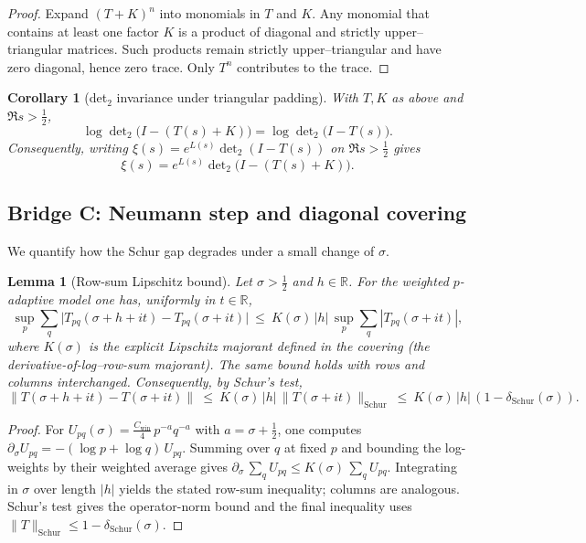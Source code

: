 \documentclass[11pt]{article}
\newtheorem{lemma}[theorem]{Lemma}
\newtheorem{corollary}[theorem]{Corollary}
\theoremstyle{definition}
\theoremstyle{remark}
\newcommand{\R}{\mathbb{R}}
\begin{document}
\begin{proof}
Expand $(T+K)^n$ into monomials in $T$ and $K$. Any monomial that contains at least one factor $K$ is a product of diagonal and strictly upper--triangular matrices. Such products remain strictly upper--triangular and have zero diagonal, hence zero trace. Only $T^n$ contributes to the trace.
\end{proof}

\begin{corollary}[det$_2$ invariance under triangular padding]\label{cor:det2-invariance}
With $T, K$ as above and $\Re s>\tfrac12$,
\[
\log\det\nolimits_2\!\big(I-(T(s)+K)\big) = \log\det\nolimits_2\!\big(I-T(s)\big).
\]
Consequently, writing $\xi(s)=e^{L(s)}\det_2(I-T(s))$ on $\Re s>\tfrac12$ gives
\[
\xi(s)=e^{L(s)}\det\nolimits_2\!\big(I-(T(s)+K)\big).
\]
\end{corollary}

\subsection*{Bridge C: Neumann step and diagonal covering}

We quantify how the Schur gap degrades under a small change of $\sigma$.

\begin{lemma}[Row-sum Lipschitz bound]\label{lem:rowsum-lip}
Let $\sigma>\tfrac12$ and $h\in\R$. For the weighted $p$-adaptive model one has, uniformly in $t\in\R$,
\[
  \sup_p \sum_q \big| T_{pq}(\sigma+h+it)-T_{pq}(\sigma+it)\big|\ \le\ K(\sigma)\,|h|\,\sup_p \sum_q |T_{pq}(\sigma+it)|,
\]
where $K(\sigma)$ is the explicit Lipschitz majorant defined in the covering (the derivative-of-log--row-sum majorant). The same bound holds with rows and columns interchanged. Consequently, by Schur's test,
\[
  \|T(\sigma+h+it)-T(\sigma+it)\|\ \le\ K(\sigma)\,|h|\,\|T(\sigma+it)\|_{\mathrm{Schur}}\ \le\ K(\sigma)\,|h|\,(1-\delta_{\mathrm{Schur}}(\sigma)).
\]
\end{lemma}
\begin{proof}
For $U_{pq}(\sigma)=\frac{C_{\mathrm{win}}}{4}\,p^{-a}q^{-a}$ with $a=\sigma+\tfrac12$, one computes $\partial_\sigma U_{pq}=-(\log p+\log q)\,U_{pq}$. Summing over $q$ at fixed $p$ and bounding the log-weights by their weighted average gives $\partial_\sigma\,\sum_q U_{pq}\le K(\sigma)\,\sum_q U_{pq}$. Integrating in $\sigma$ over length $|h|$ yields the stated row-sum inequality; columns are analogous. Schur's test gives the operator-norm bound and the final inequality uses $\|T\|_{\mathrm{Schur}}\le 1-\delta_{\mathrm{Schur}}(\sigma)$.
\end{proof}
\end{document}
